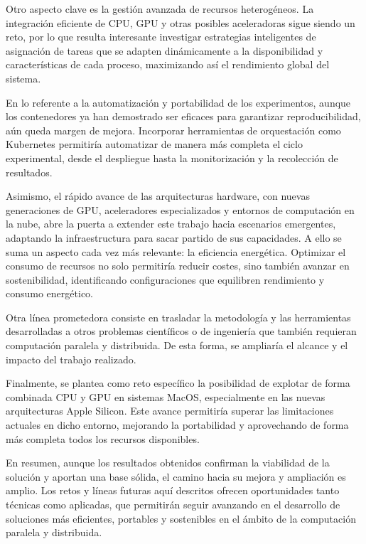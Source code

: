 Otro aspecto clave es la gestión avanzada de recursos heterogéneos. La integración eficiente de CPU, GPU y otras posibles aceleradoras sigue siendo un reto, por lo que resulta interesante investigar estrategias inteligentes de asignación de tareas que se adapten dinámicamente a la disponibilidad y características de cada proceso, maximizando así el rendimiento global del sistema.

En lo referente a la automatización y portabilidad de los experimentos, aunque los contenedores ya han demostrado ser eficaces para garantizar reproducibilidad, aún queda margen de mejora. Incorporar herramientas de orquestación como Kubernetes permitiría automatizar de manera más completa el ciclo experimental, desde el despliegue hasta la monitorización y la recolección de resultados.

Asimismo, el rápido avance de las arquitecturas hardware, con nuevas generaciones de GPU, aceleradores especializados y entornos de computación en la nube, abre la puerta a extender este trabajo hacia escenarios emergentes, adaptando la infraestructura para sacar partido de sus capacidades. A ello se suma un aspecto cada vez más relevante: la eficiencia energética. Optimizar el consumo de recursos no solo permitiría reducir costes, sino también avanzar en sostenibilidad, identificando configuraciones que equilibren rendimiento y consumo energético.

Otra línea prometedora consiste en trasladar la metodología y las herramientas desarrolladas a otros problemas científicos o de ingeniería que también requieran computación paralela y distribuida. De esta forma, se ampliaría el alcance y el impacto del trabajo realizado.

Finalmente, se plantea como reto específico la posibilidad de explotar de forma combinada CPU y GPU en sistemas MacOS, especialmente en las nuevas arquitecturas Apple Silicon. Este avance permitiría superar las limitaciones actuales en dicho entorno, mejorando la portabilidad y aprovechando de forma más completa todos los recursos disponibles.

En resumen, aunque los resultados obtenidos confirman la viabilidad de la solución y aportan una base sólida, el camino hacia su mejora y ampliación es amplio. Los retos y líneas futuras aquí descritos ofrecen oportunidades tanto técnicas como aplicadas, que permitirán seguir avanzando en el desarrollo de soluciones más eficientes, portables y sostenibles en el ámbito de la computación paralela y distribuida.

